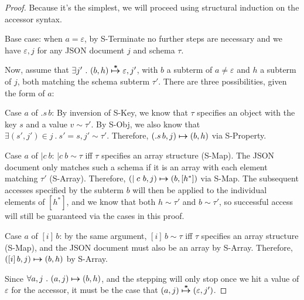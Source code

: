 \documentclass[11pt]{article}
\newcommand{\jarr}[1]{\left[#1\right]}   %
\newcommand{\matches}[2]{{#1}\sim{#2}}   %
\newcommand{\aeps}{\varepsilon}          %
\newcommand{\akey}[2]{.{#1}\,{#2}}       %
\newcommand{\aidx}[2]{[#1]\,{#2}}        %
\newcommand{\apipe}[1]{\mid {#1}}        %
\begin{document}
\begin{proof}

Because it's the simplest, we will proceed using structural induction on the accessor syntax.

Base case: when $a = \aeps$, by S-Terminate no further steps are necessary and we have $\aeps,j$ for any JSON document $j$ and schema $\tau$.

Now, assume that $\exists j' \ . \ \evals{(b, h)}{\aeps, j'}$, with $b$ a subterm of $a \neq \aeps$ and $h$ a subterm of $j$, both matching the schema subterm $\tau'$. There are three possibilities, given the form of $a$:

Case $a$ of $\akey{s}{b}$: By inversion of S-Key, we know that $\tau$ specifies an object with the key $s$ and a value $\matches{v}{\tau'}$. By S-Obj, we also know that $\exists (s', j') \in j \ . \ s'=s, \matches{j'}{\tau'}$. Therefore, $\steps{(\akey{s}{b}, j)}{(b, h)}$ via S-Property.

Case $a$ of $\apipe{c}\ b$: $\matches{\apipe{c}\ b}{\tau}$ iff $\tau$ specifies an array structure (S-Map). The JSON document only matches such a schema if it is an array with each element matching $\tau'$ (S-Array). Therefore, $\steps{(\apipe{c}\ b, j)}{(b,\jarr{h^*})}$ via S-Map. The subsequent accesses specified by the subterm $b$ will then be applied to the individual elements of $\jarr{h^*}$, and we know that both $\matches{h}{\tau'}$ and $\matches{b}{\tau'}$, so successful access will still be guaranteed via the cases in this proof.

Case $a$ of $\aidx{i}{b}$: by the same argument, $\matches{\aidx{i}{b}}{\tau}$ iff $\tau$ specifies an array structure (S-Map), and the JSON document must also be an array by S-Array. Therefore, $\steps{(\aidx{i}{b},j)}{(b,h)}$ by S-Array.

Since $\forall a,j\ . \ \steps{(a,j)}{(b,h)}$, and the stepping will only stop once we hit a value of $\aeps$ for the accessor, it must be the case that $\evals{(a,j)}{(\aeps, j')}$.

\end{proof}
\end{document}
